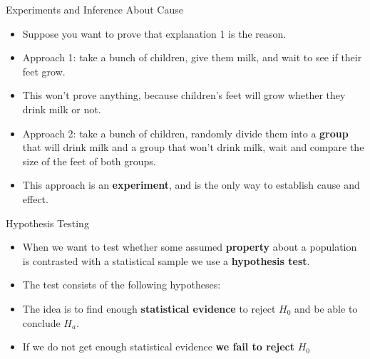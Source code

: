 \documentclass[handout]{beamer}
\begin{document}
\begin{frame}{Experiments and Inference About Cause}
\scriptsize{

\begin{itemize}

 \item Suppose you want to prove that explanation 1 is the reason.
 \item Approach 1: take a bunch of children, give them milk, and wait to see if their feet grow.
 \item This won't prove anything, because children's feet will grow whether they drink milk or not.
 \item Approach 2: take a bunch of children, randomly divide them into a \textbf{group} that will drink milk and a group that won't drink milk, wait and compare the size of the feet of both groups. 
 \item This approach is an \textbf{experiment}, and is the only way to establish cause and effect.
 
\end{itemize}



} 
\end{frame}


\begin{frame}{Hypothesis Testing}
\scriptsize{
\begin{itemize}
 \item When we want to test whether some assumed \textbf{property} about a population is contrasted with a statistical sample we use a \textbf{hypothesis test}.
\item The test consists of the following hypotheses:
\item The idea is to find enough \textbf{statistical evidence} to reject $H_{0}$ and be able to conclude $H_{a}$.
\item If we do not get enough statistical evidence \textbf{we fail to reject} $H_{0}$

\end{itemize}



} 
\end{frame}
\end{document}
